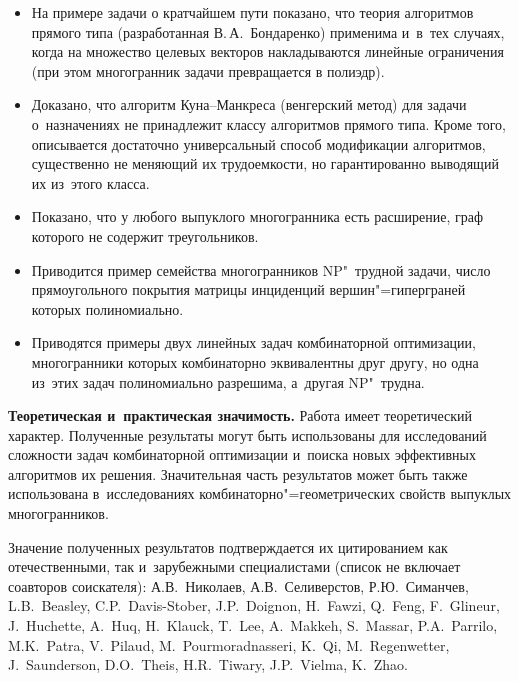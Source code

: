 \begin{enumerate}
\begin{itemize}
	\item На примере задачи о кратчайшем пути показано, что теория алгоритмов прямого типа (разработанная В.\,А.~Бондаренко) применима и~в~тех случаях, когда на множество целевых векторов накладываются линейные ограничения (при этом многогранник задачи превращается в полиэдр).
	\item Доказано, что алгоритм Куна--Манкреса (венгерский метод) для задачи о~назначениях не принадлежит классу алгоритмов прямого типа.
	Кроме того, описывается достаточно универсальный способ модификации алгоритмов,
	существенно не меняющий их трудоемкости, но гарантированно выводящий их из~этого класса.
	\item Показано, что у любого выпуклого многогранника есть расширение, 
	граф которого не содержит треугольников. 
	\item Приводится пример семейства многогранников NP"~трудной задачи, число прямоугольного покрытия матрицы инциденций вершин"=гиперграней которых полиномиально. 
	\item Приводятся примеры двух линейных задач комбинаторной оптимизации, многогранники которых комбинаторно эквивалентны друг другу, но одна из~этих задач полиномиально разрешима, а~другая NP"~трудна.
\end{itemize}
\end{enumerate}


\textbf{Теоретическая и~практическая значимость.}
Работа имеет теоретический характер.
Полученные результаты могут быть использованы для исследований
сложности задач комбинаторной оптимизации и~поиска новых эффективных алгоритмов их решения. Значительная часть результатов может быть также использована в~исследованиях комбинаторно"=геометрических свойств выпуклых многогранников.

Значение полученных результатов подтверждается их цитированием как отечественными,
так и~зарубежными специалистами (список не включает соавторов соискателя):
А.В.~Николаев, А.В.~Селиверстов, Р.Ю.~Симанчев, 
\foreignlanguage{english}{
L.B.~Beas\-ley, C.P.~Davis-Stober, J.P.~Doignon, H.~Fawzi, Q.~Feng, F.~Glineur, J.~Huchette, A.~Huq, H.~Klauck, T.~Lee, A.~Makkeh, S.~Massar, P.A.~Parrilo, M.K.~Patra, V.~Pilaud, M.~Pourmoradnasseri, K.~Qi, M.~Regenwetter, J.~Saunderson, D.O.~Theis, H.R.~Tiwary, J.P.~Vi\-el\-ma, K.~Zhao.}


